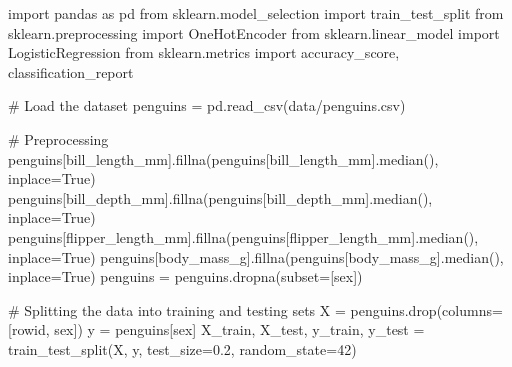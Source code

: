 \documentclass[
  letterpaper,
  chapter,a4paper,showtrims,openright,hidelinks]{oblivoir}
\newenvironment{Shaded}{\begin{snugshade}}{\end{snugshade}}
\newcommand{\CommentTok}[1]{\textcolor[rgb]{0.37,0.37,0.37}{#1}}
\newcommand{\DecValTok}[1]{\textcolor[rgb]{0.68,0.00,0.00}{#1}}
\newcommand{\FloatTok}[1]{\textcolor[rgb]{0.68,0.00,0.00}{#1}}
\newcommand{\ImportTok}[1]{\textcolor[rgb]{0.00,0.46,0.62}{#1}}
\newcommand{\NormalTok}[1]{\textcolor[rgb]{0.00,0.23,0.31}{#1}}
\newcommand{\OperatorTok}[1]{\textcolor[rgb]{0.37,0.37,0.37}{#1}}
\newcommand{\StringTok}[1]{\textcolor[rgb]{0.13,0.47,0.30}{#1}}
\newcommand{\VariableTok}[1]{\textcolor[rgb]{0.07,0.07,0.07}{#1}}
\begin{document}
\begin{Shaded}
\begin{Highlighting}[]
\ImportTok{import}\NormalTok{ pandas }\ImportTok{as}\NormalTok{ pd}
\ImportTok{from}\NormalTok{ sklearn.model\_selection }\ImportTok{import}\NormalTok{ train\_test\_split}
\ImportTok{from}\NormalTok{ sklearn.preprocessing }\ImportTok{import}\NormalTok{ OneHotEncoder}
\ImportTok{from}\NormalTok{ sklearn.linear\_model }\ImportTok{import}\NormalTok{ LogisticRegression}
\ImportTok{from}\NormalTok{ sklearn.metrics }\ImportTok{import}\NormalTok{ accuracy\_score, classification\_report}

\CommentTok{\# Load the dataset}
\NormalTok{penguins }\OperatorTok{=}\NormalTok{ pd.read\_csv(}\StringTok{\textquotesingle{}data/penguins.csv\textquotesingle{}}\NormalTok{)}

\CommentTok{\# Preprocessing}
\NormalTok{penguins[}\StringTok{\textquotesingle{}bill\_length\_mm\textquotesingle{}}\NormalTok{].fillna(penguins[}\StringTok{\textquotesingle{}bill\_length\_mm\textquotesingle{}}\NormalTok{].median(), inplace}\OperatorTok{=}\VariableTok{True}\NormalTok{)}
\NormalTok{penguins[}\StringTok{\textquotesingle{}bill\_depth\_mm\textquotesingle{}}\NormalTok{].fillna(penguins[}\StringTok{\textquotesingle{}bill\_depth\_mm\textquotesingle{}}\NormalTok{].median(), inplace}\OperatorTok{=}\VariableTok{True}\NormalTok{)}
\NormalTok{penguins[}\StringTok{\textquotesingle{}flipper\_length\_mm\textquotesingle{}}\NormalTok{].fillna(penguins[}\StringTok{\textquotesingle{}flipper\_length\_mm\textquotesingle{}}\NormalTok{].median(), inplace}\OperatorTok{=}\VariableTok{True}\NormalTok{)}
\NormalTok{penguins[}\StringTok{\textquotesingle{}body\_mass\_g\textquotesingle{}}\NormalTok{].fillna(penguins[}\StringTok{\textquotesingle{}body\_mass\_g\textquotesingle{}}\NormalTok{].median(), inplace}\OperatorTok{=}\VariableTok{True}\NormalTok{)}
\NormalTok{penguins }\OperatorTok{=}\NormalTok{ penguins.dropna(subset}\OperatorTok{=}\NormalTok{[}\StringTok{\textquotesingle{}sex\textquotesingle{}}\NormalTok{])}

\CommentTok{\# Splitting the data into training and testing sets}
\NormalTok{X }\OperatorTok{=}\NormalTok{ penguins.drop(columns}\OperatorTok{=}\NormalTok{[}\StringTok{\textquotesingle{}rowid\textquotesingle{}}\NormalTok{, }\StringTok{\textquotesingle{}sex\textquotesingle{}}\NormalTok{])}
\NormalTok{y }\OperatorTok{=}\NormalTok{ penguins[}\StringTok{\textquotesingle{}sex\textquotesingle{}}\NormalTok{]}
\NormalTok{X\_train, X\_test, y\_train, y\_test }\OperatorTok{=}\NormalTok{ train\_test\_split(X, y, test\_size}\OperatorTok{=}\FloatTok{0.2}\NormalTok{, random\_state}\OperatorTok{=}\DecValTok{42}\NormalTok{)}


\end{Highlighting}
\end{Shaded}
\end{document}
